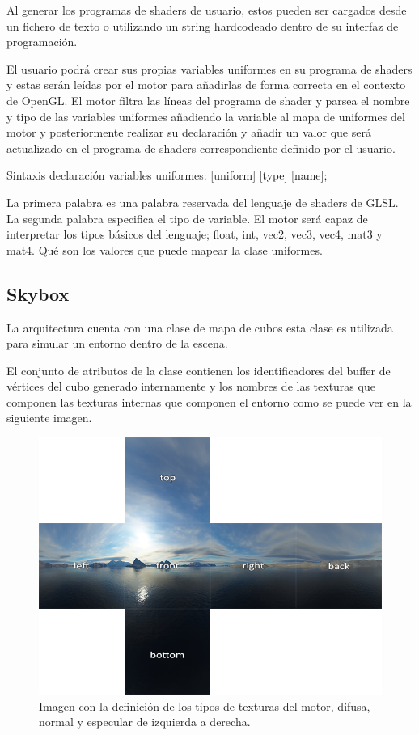 \documentclass[a4paper, 17pt]{book}
\begin{document}
Al generar los programas de shaders de usuario, estos pueden ser cargados desde un fichero de texto o utilizando un string hardcodeado
dentro de su interfaz de programación.

El usuario podrá crear sus propias variables uniformes en su programa de shaders y estas serán leídas por el motor para añadirlas de
forma correcta en el contexto de OpenGL. El motor filtra las líneas del programa de shader y parsea el nombre y tipo de las variables
uniformes añadiendo la variable al mapa de uniformes del motor y posteriormente realizar su declaración y añadir un valor que será
actualizado en el programa de shaders correspondiente definido por el usuario.

{\Large Sintaxis declaración variables uniformes:  [uniform]    [type]    [name];\par}

La primera palabra es una palabra reservada del lenguaje de shaders de GLSL. La segunda palabra especifica el tipo de variable. El motor
será capaz de interpretar los tipos básicos del lenguaje; float, int, vec2, vec3, vec4, mat3 y mat4. Qué son los valores que puede mapear
la clase uniformes. 

\subsection{Skybox}
\label{subsec:Skybox}

La arquitectura cuenta con una clase de mapa de cubos esta clase es utilizada para simular un entorno dentro de la escena. 

El conjunto de atributos de la clase contienen los identificadores del buffer de vértices del cubo generado internamente y
los nombres de las texturas que componen las texturas internas que componen el entorno como se puede ver en la siguiente imagen.

\begin{figure}[hbt!]
    \centering
    \includegraphics[scale=0.40, keepaspectratio]{img/cubemaps_skybox.png}
    \caption{Imagen con la definición de los tipos de texturas del motor, difusa, normal y especular de izquierda a derecha.}
    \label{figura:cubemaps_skybox}
\end{figure}
\end{document}
